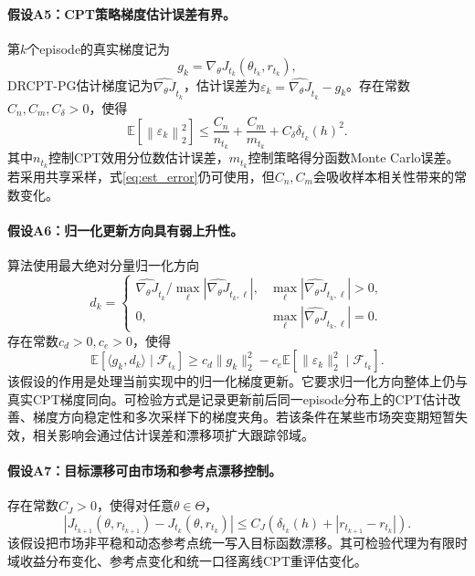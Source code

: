 \documentclass{sufethesismas}
\begin{document}
\paragraph{假设A5：CPT策略梯度估计误差有界。}
第$k$个episode的真实梯度记为
\begin{equation*}
g_k
=
\nabla_\theta J_{t_k}(\theta_{t_k},r_{t_k}),
\end{equation*}
DRCPT-PG估计梯度记为$\widehat{\nabla_\theta J}_{t_k}$，估计误差为$\varepsilon_k=\widehat{\nabla_\theta J}_{t_k}-g_k$。存在常数$C_n,C_m,C_\delta>0$，使得
\begin{equation}
\label{eq:est_error}
\mathbb{E}
\left[
\left\|
\varepsilon_k
\right\|_2^2
\right]
\le
\frac{C_n}{n_{t_k}}
+
\frac{C_m}{m_{t_k}}
+
C_\delta \delta_{t_k}(h)^2.
\end{equation}
其中$n_{t_k}$控制CPT效用分位数估计误差，$m_{t_k}$控制策略得分函数Monte Carlo误差。若采用共享采样，式\eqref{eq:est_error}仍可使用，但$C_n,C_m$会吸收样本相关性带来的常数变化。

\paragraph{假设A6：归一化更新方向具有弱上升性。}
算法使用最大绝对分量归一化方向
\begin{equation}
\label{eq:normalized_direction}
d_k
=
\begin{cases}
\widehat{\nabla_\theta J}_{t_k}/\max_\ell|\widehat{\nabla_\theta J}_{t_k,\ell}|, &
\max_\ell|\widehat{\nabla_\theta J}_{t_k,\ell}|>0,\\[4pt]
0, & \max_\ell|\widehat{\nabla_\theta J}_{t_k,\ell}|=0.
\end{cases}
\end{equation}
存在常数$c_d>0,c_e>0$，使得
\begin{equation}
\label{eq:ascent_alignment}
\mathbb{E}
\left[
\langle g_k,d_k\rangle
\mid \mathcal{F}_{t_k}
\right]
\ge
c_d\|g_k\|_2^2
-
c_e\mathbb{E}
\left[
\|\varepsilon_k\|_2^2
\mid \mathcal{F}_{t_k}
\right].
\end{equation}
该假设的作用是处理当前实现中的归一化梯度更新。它要求归一化方向整体上仍与真实CPT梯度同向。可检验方式是记录更新前后同一episode分布上的CPT估计改善、梯度方向稳定性和多次采样下的梯度夹角。若该条件在某些市场突变期短暂失效，相关影响会通过估计误差和漂移项扩大跟踪邻域。

\paragraph{假设A7：目标漂移可由市场和参考点漂移控制。}
存在常数$C_J>0$，使得对任意$\theta\in\Theta$，
\begin{equation}
\label{eq:target_drift}
\left|
J_{t_{k+1}}(\theta,r_{t_{k+1}})
-
J_{t_k}(\theta,r_{t_k})
\right|
\le
C_J
\left(
\delta_{t_k}(h)+|r_{t_{k+1}}-r_{t_k}|
\right).
\end{equation}
该假设把市场非平稳和动态参考点统一写入目标函数漂移。其可检验代理为有限时域收益分布变化、参考点变化和统一口径离线CPT重评估变化。
\end{document}
